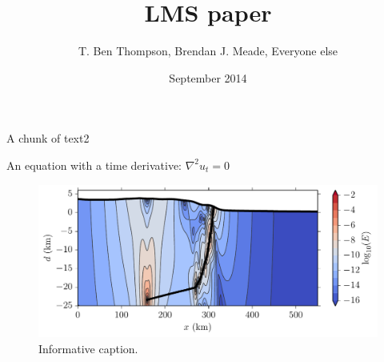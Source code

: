 \documentclass{article}
\title{LMS paper}
\author{T. Ben Thompson, Brendan J. Meade, Everyone else}
\date{September 2014}
\begin{document}
\maketitle

A chunk of text2

An equation with a time derivative:
$\nabla^2 u_t = 0$

\begin{figure}[h!]
  \centering
     \includegraphics[width=5in]{figs/log_energy_density.pdf}
   \caption{Informative caption.}
\end{figure}
\end{document}
